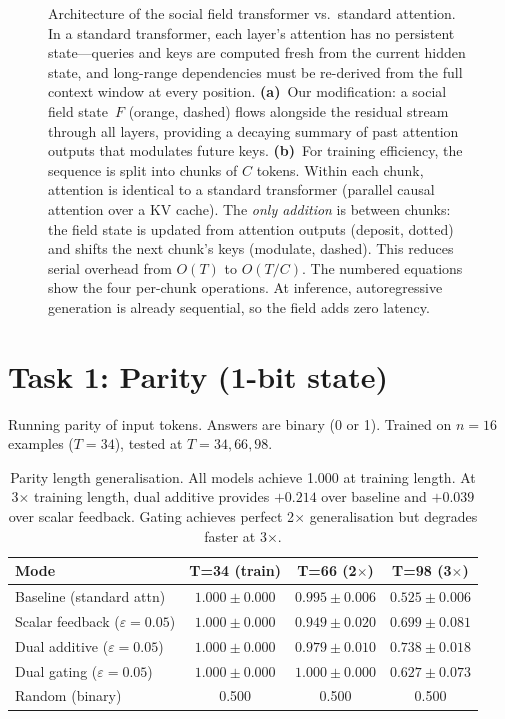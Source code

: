 \documentclass[11pt,a4paper]{article}
\begin{document}
\begin{figure}[t]
{\begin{tikzpicture}
\end{tikzpicture}
}%
\caption{Architecture of the social field transformer vs.\ standard
attention.  In a standard transformer, each layer's attention has no
persistent state---queries and keys are computed fresh from the current
hidden state, and long-range dependencies must be re-derived from the
full context window at every position.
\textbf{(a)}~Our modification: a social field state~$F$ (orange, dashed)
flows alongside the residual stream through all layers, providing a
decaying summary of past attention outputs that modulates future keys.
\textbf{(b)}~For training efficiency, the sequence is split into chunks
of $C$ tokens.  Within each chunk, attention is identical to a standard
transformer (parallel causal attention over a KV cache).  The
\emph{only addition} is between chunks: the field state is updated from
attention outputs (deposit, dotted) and shifts the next chunk's keys
(modulate, dashed).  This reduces serial overhead from $O(T)$ to
$O(T/C)$.  The numbered equations show the four per-chunk operations.
At inference, autoregressive generation is already sequential, so the
field adds zero latency.}
\label{fig:architecture}
\end{figure}


\section{Task 1: Parity (1-bit state)}

Running parity of input tokens.  Answers are binary (0 or 1).
Trained on $n=16$ examples ($T=34$), tested at $T=34, 66, 98$.

\begin{table}[h]
\centering
\begin{tabular}{@{}lccc@{}}
\toprule
\textbf{Mode} & \textbf{T=34 (train)} & \textbf{T=66 (2$\times$)}
& \textbf{T=98 (3$\times$)} \\
\midrule
Baseline (standard attn) & $1.000 \pm 0.000$ & $0.995 \pm 0.006$
& $0.525 \pm 0.006$ \\
Scalar feedback ($\varepsilon\!=\!0.05$) & $1.000 \pm 0.000$
& $0.949 \pm 0.020$ & $0.699 \pm 0.081$ \\
Dual additive ($\varepsilon\!=\!0.05$) & $1.000 \pm 0.000$
& $0.979 \pm 0.010$ & $\mathbf{0.738 \pm 0.018}$ \\
Dual gating ($\varepsilon\!=\!0.05$) & $1.000 \pm 0.000$
& $\mathbf{1.000 \pm 0.000}$ & $0.627 \pm 0.073$ \\
\addlinespace
Random (binary) & 0.500 & 0.500 & 0.500 \\
\bottomrule
\end{tabular}
\caption{Parity length generalisation.  All models achieve 1.000 at
training length.  At 3$\times$ training length, dual additive
provides $+0.214$ over baseline and $+0.039$ over scalar feedback.
Gating achieves perfect 2$\times$ generalisation but degrades faster
at 3$\times$.}
\label{tab:parity}
\end{table}
\end{document}
